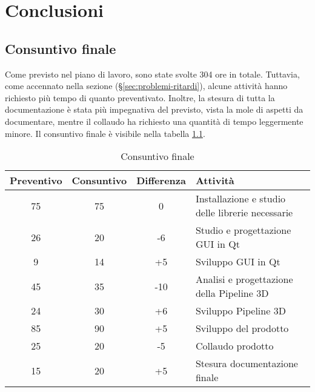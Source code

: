 
\chapter{Conclusioni}
\label{cap:conclusioni}

\section{Consuntivo finale}
Come previsto nel piano di lavoro, sono state svolte 304 ore in totale. Tuttavia, come accennato nella sezione  (§\ref{sec:problemi-ritardi}), alcune attività hanno richiesto più tempo di quanto preventivato. Inoltre, la stesura di tutta la documentazione è stata più impegnativa del previsto, vista la mole di aspetti da documentare, mentre il collaudo ha richiesto una quantità di tempo leggermente minore. Il consuntivo finale è visibile nella tabella \ref{table:consuntivo-finale}.

\begin{center}
    \begin{table}[h]
    \def\arraystretch{1.5}
    \setlength\extrarowheight{5pt}
    \begin{tabular}{| c | c | c | p{5cm} |}
        \hline
        \textbf{Preventivo} & \textbf{Consuntivo} & \textbf{Differenza} & \textbf{Attività} \\ \hline  
        75 & 75 & 0 & Installazione e studio delle librerie necessarie\\ \hline
        26 & 20 & -6 & Studio e progettazione GUI in Qt\\ \hline
        9 & 14 & +5 & Sviluppo GUI in Qt\\ \hline
        45 & 35 & -10 & Analisi e progettazione della Pipeline 3D\\ \hline
        24 & 30 & +6 & Sviluppo Pipeline 3D\\ \hline
        85 & 90 & +5 & Sviluppo del prodotto\\ \hline
        25 & 20 & -5 & Collaudo prodotto\\ \hline
        15 & 20 & +5 & Stesura documentazione finale\\ \hline
    \end{tabular}
    \caption{Consuntivo finale}
    \label{table:consuntivo-finale}
    \end{table}
\end{center}

